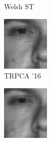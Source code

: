 \begin{figure}
\begin{subfigure}[b]{.19\linewidth}
\caption{Welsh ST}
\end{subfigure}\hfill
\begin{subfigure}[b]{.19\linewidth}
    \includegraphics[width = \linewidth]{DN_yale/yale_03_1_cvpr2016_tnn_fsim}
    \caption{TRPCA '16}
\end{subfigure}\hfill
\begin{subfigure}[b]{.19\linewidth}
    \includegraphics[width = \linewidth]{DN_yale/yale_03_1_horpca_s_fsim} 

\end{subfigure}
\end{figure}
